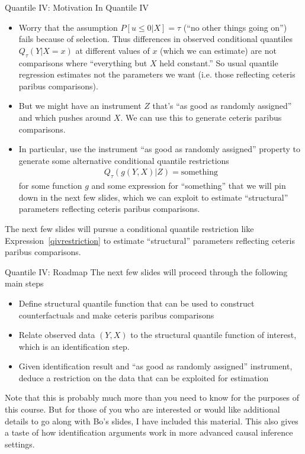 \documentclass[aspectratio=169, handout]{beamer}
\begin{document}
{\scriptsize
\begin{frame}{Quantile IV: Motivation}
In Quantile IV
\begin{itemize}
  \item Worry that the assumption
    $P[u\leq 0|X]=\tau$ (``no other things going on'') fails because of
    selection.
    Thus differences in \alert{observed} conditional quantiles
    $Q_\tau(Y|X=x)$ at different values of $x$ (which we can estimate)
    are \alert{not} comparisons where ``everything but $X$ held
    constant.''
    So usual quantile regression estimates not the parameters we want
    (i.e.  those reflecting ceteris paribus comparisons).

  \item But we might have an \alert{instrument} $Z$ that's ``as good as
    randomly assigned'' and which pushes around $X$.
    We can use this to generate ceteris paribus comparisons.

  \item
    In particular,
    use the instrument ``as good as randomly assigned''
    property to generate some alternative conditional quantile
    restrictions
    \begin{align}
      Q_\tau(g(Y,X)|Z)=\text{something}
      \label{qivrestriction}
    \end{align}
    for some function $g$ and some expression for ``something'' that we will
    pin down in the next few slides,
    which we can exploit to estimate ``structural'' parameters
    reflecting ceteris paribus comparisons.
\end{itemize}
The next few slides will pursue a conditional quantile restriction like
Expression~\ref{qivrestriction} to estimate ``structural'' parameters
reflecting ceteris paribus comparisons.
\end{frame}
}



{\footnotesize
\begin{frame}{Quantile IV: Roadmap}
The next few slides will proceed through the following main steps
\begin{itemize}
  \item Define \alert{structural} quantile function that can be used to
    construct counterfactuals and make ceteris paribus comparisons
  \item Relate \alert{observed} data $(Y,X)$ to the \alert{structural}
    quantile function of interest, which is an \alert{identification}
    step.
  \item
    Given identification result and ``as good as randomly assigned''
    instrument, deduce a \alert{restriction} on the data that can be
    exploited for \alert{estimation}
\end{itemize}
Note that this is probably much more than you need to know for the
purposes of this course.
But for those of you who are interested or would like additional details
to go along with Bo's slides, I have included this material.
This also gives a taste of how identification arguments work in more
advanced causal inference settings.
\end{frame}
}
\end{document}
